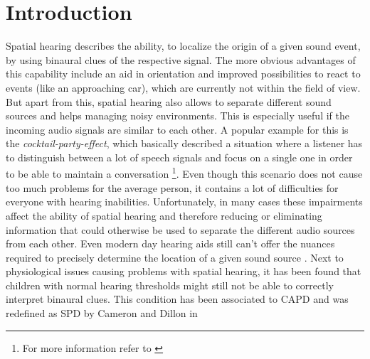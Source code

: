 \documentclass[a4paper,11pt]{article}%
\renewcommand{\\}{\vspace*{0.5\baselineskip} \newline}
\begin{document}
\newpage


\section{Introduction}
\label{sec:introduction}
Spatial hearing describes the ability, to localize the origin of a given sound event, by using binaural clues of the respective signal. The more obvious advantages of this capability include an aid in orientation and improved possibilities to react to events (like an approaching car), which are currently not within the field of view.
\newline
\newline
But apart from this, spatial hearing also allows to separate different sound sources and helps managing noisy environments. This is especially useful if the incoming audio signals are similar to each other. A popular example for this is the \textit{cocktail-party-effect}, which basically described a situation where a listener has to distinguish between a lot of speech signals and focus on a single one in order to be able to maintain a conversation \footnote{For more information refer to \cite{CP}}.
\newline
\newline
Even though this scenario does not cause too much problems for the average person, it contains a lot of difficulties for everyone with hearing inabilities. Unfortunately, in many cases these impairments affect the ability of spatial hearing and therefore reducing or eliminating information that could otherwise be used to separate the different audio sources from each other. Even modern day hearing aids still can't offer the nuances required to precisely determine the location of a given sound source \cite{HA-SRT}.
\newline
\newline
Next to physiological issues causing problems with spatial hearing, it has been found that children with normal hearing thresholds might still not be able to correctly interpret binaural clues. This condition has been associated to \ac{CAPD} and was redefined as \ac{SPD} by Cameron and Dillon in 
\end{document}
